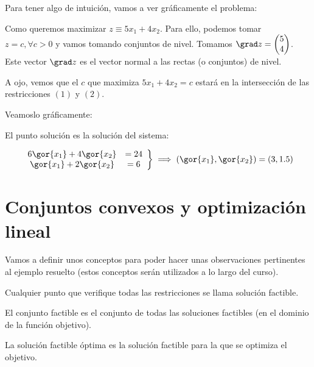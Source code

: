 \documentclass[palatino,nochap]{apuntes}
\begin{document}
\begin{example}
Para tener algo de intuición, vamos a ver gráficamente el problema:

\begin{center}

\end{center}


Como queremos maximizar $z\equiv 5x_1+4x_2$. Para ello, podemos tomar $z = c, ∀c>0$ y vamos tomando conjuntos de nivel. Tomamos $\grad z = \begin{pmatrix}5\\4\end{pmatrix}$. Este vector $\grad z$ es el vector normal a las rectas (o conjuntos) de nivel.

A ojo, vemos que el $c$ que maximiza $5x_1 + 4x_2 = c$ estará en la intersección de las restricciones $(1)$ y $(2)$.

Veamoslo gráficamente:

\begin{center}

\end{center}


El punto solución es la solución del sistema:

\[
\left.\begin{array}{cc} 6\gor{x_1} + 4\gor{x_2} &= 24\\ \gor{x_1} + 2\gor{x_2} &= 6\end{array}\right\} \implies (\gor{x_1},\gor{x_2}) = (3,1.5)
\]
\end{example}


\chapter{Conjuntos convexos y optimización lineal}

Vamos a definir unos conceptos para poder hacer unas observaciones pertinentes al ejemplo resuelto (estos conceptos serán utilizados a lo largo del curso).


\begin{defn}
Cualquier punto que verifique todas las restricciones se llama solución factible.
\end{defn}

\begin{defn}
El conjunto factible es el conjunto de todas las soluciones factibles (en el dominio de la función objetivo).
\end{defn}

\begin{defn}
La solución factible óptima es la solución factible para la que se optimiza el objetivo.
\end{defn}
\end{document}
